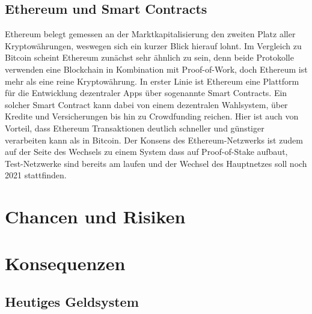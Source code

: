 \documentclass[12pt,oneside]{article}
\begin{document}
\subsection{Ethereum und Smart Contracts}

Ethereum belegt gemessen an der Marktkapitalisierung den zweiten Platz aller Kryptowährungen, weswegen sich ein kurzer Blick hierauf lohnt. Im Vergleich zu Bitcoin scheint Ethereum zunächst sehr ähnlich zu sein, denn beide Protokolle verwenden eine Blockchain in Kombination mit Proof-of-Work, doch Ethereum ist mehr als eine reine Kryptowährung. In erster Linie ist Ethereum eine Plattform für die Entwicklung dezentraler Apps über sogenannte Smart Contracts. Ein solcher Smart Contract kann dabei von einem dezentralen Wahlsystem, über Kredite und Versicherungen bis hin zu Crowdfunding reichen. Hier ist auch von Vorteil, dass Ethereum Transaktionen deutlich schneller und günstiger verarbeiten kann als in Bitcoin. Der Konsens des Ethereum-Netzwerks ist zudem auf der Seite des Wechsels zu einem System dass auf Proof-of-Stake aufbaut, Test-Netzwerke sind bereits am laufen und der Wechsel des Hauptnetzes soll noch 2021 stattfinden. \cite{soeteman2019}

\section{Chancen und Risiken}


\section{Konsequenzen}

\subsection{Heutiges Geldsystem}

\clearpage
\lhead{}
\printbibliography
{}



\end{document}
